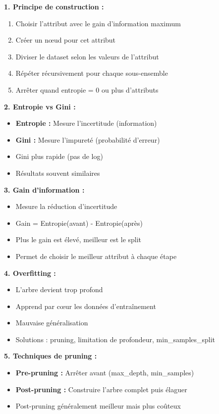 \documentclass[11pt,a4paper]{article}
\begin{document}
\begin{solutionbox}
\textbf{1. Principe de construction :}
\begin{enumerate}
    \item Choisir l'attribut avec le gain d'information maximum
    \item Créer un nœud pour cet attribut
    \item Diviser le dataset selon les valeurs de l'attribut
    \item Répéter récursivement pour chaque sous-ensemble
    \item Arrêter quand entropie = 0 ou plus d'attributs
\end{enumerate}

\textbf{2. Entropie vs Gini :}
\begin{itemize}
    \item \textbf{Entropie :} Mesure l'incertitude (information)
    \item \textbf{Gini :} Mesure l'impureté (probabilité d'erreur)
    \item Gini plus rapide (pas de log)
    \item Résultats souvent similaires
\end{itemize}

\textbf{3. Gain d'information :}
\begin{itemize}
    \item Mesure la réduction d'incertitude
    \item Gain = Entropie(avant) - Entropie(après)
    \item Plus le gain est élevé, meilleur est le split
    \item Permet de choisir le meilleur attribut à chaque étape
\end{itemize}

\textbf{4. Overfitting :}
\begin{itemize}
    \item L'arbre devient trop profond
    \item Apprend par cœur les données d'entraînement
    \item Mauvaise généralisation
    \item Solutions : pruning, limitation de profondeur, min\_samples\_split
\end{itemize}

\textbf{5. Techniques de pruning :}
\begin{itemize}
    \item \textbf{Pre-pruning :} Arrêter avant (max\_depth, min\_samples)
    \item \textbf{Post-pruning :} Construire l'arbre complet puis élaguer
    \item Post-pruning généralement meilleur mais plus coûteux
\end{itemize}


\end{solutionbox}
\end{document}
